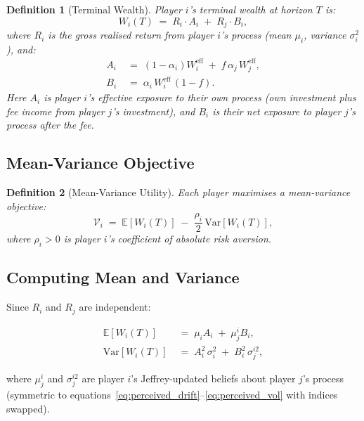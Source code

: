 \documentclass[12pt,a4paper]{article}
\newtheorem{definition}{Definition}[section]
\newcommand{\E}{\mathbb{E}}
\newcommand{\Var}{\mathrm{Var}}
\newcommand{\1}{\mathbf{1}}
\begin{document}
\begin{definition}[Terminal Wealth]
Player $i$'s terminal wealth at horizon $T$ is:
\begin{equation}
  W_i(T) \;=\; R_i \cdot A_i \;+\; R_j \cdot B_i,
  \label{eq:terminal_wealth}
\end{equation}
where $R_i$ is the gross realised return from player $i$'s process (mean $\mu_i$, variance $\sigma_i^2$), and:
\begin{align}
  A_i &\;=\; (1-\alpha_i) W_i^{\mathrm{eff}} \;+\; f\,\alpha_j\, W_j^{\mathrm{eff}}, \label{eq:Ai}\\
  B_i &\;=\; \alpha_i\, W_i^{\mathrm{eff}}\,(1-f). \label{eq:Bi}
\end{align}
Here $A_i$ is player $i$'s effective exposure to their own process (own investment plus fee income from player $j$'s investment), and $B_i$ is their net exposure to player $j$'s process after the fee.
\end{definition}

\subsection{Mean-Variance Objective}

\begin{definition}[Mean-Variance Utility]
Each player maximises a mean-variance objective:
\begin{equation}
  \mathcal{V}_i \;=\; \E[W_i(T)] \;-\; \frac{\rho_i}{2}\,\Var[W_i(T)],
  \label{eq:mv_utility}
\end{equation}
where $\rho_i > 0$ is player $i$'s coefficient of absolute risk aversion.
\end{definition}

\subsection{Computing Mean and Variance}

Since $R_i$ and $R_j$ are independent:

\begin{align}
  \E[W_i(T)] &\;=\; \mu_i A_i \;+\; \mu_j^i B_i, \label{eq:mean_wealth}\\
  \Var[W_i(T)] &\;=\; A_i^2\,\sigma_i^2 \;+\; B_i^2\,\sigma_j^{i2}, \label{eq:var_wealth}
\end{align}

where $\mu_j^i$ and $\sigma_j^{i2}$ are player $i$'s Jeffrey-updated beliefs about player $j$'s process (symmetric to equations~\eqref{eq:perceived_drift}--\eqref{eq:perceived_vol} with indices swapped).
\end{document}
